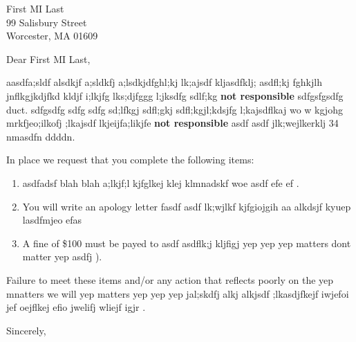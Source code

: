 \documentclass[11pt]{brownletter}
\date{November 27, 2016} %
\begin{document}
\begin{letter}{First MI Last\\
               99 Salisbury Street\\ 
               Worcester, MA 01609}

\opening{Dear First MI Last,}

aasdfa;sldf alsdkjf a;sldkfj a;lsdkjdfghl;kj lk;ajsdf kljasdfklj; asdfl;kj fghkjlh jnflkgjkdjfkd kldjf i;lkjfg lks;djfggg l;jksdfg sdlf;kg \textbf{not responsible} sdfgsfgsdfg duct. sdfgsdfg sdfg sdfg sd;lfkgj sdfl;gkj sdfl;kgjl;kdsjfg l;kajsdflkaj wo w kgjohg mrkfjeo;ilkofj ;lkajsdf lkjeijfa;likjfe  \textbf{not responsible} asdf asdf jlk;wejlkerklj 34 nmasdfn ddddn. 

In place we request that you complete the following items:
\begin{enumerate}
\item asdfadsf blah blah a;lkjf;l kjfglkej klej klmnadskf woe asdf efe ef .
\item You will write an apology letter fasdf asdf lk;wjlkf kjfgiojgih aa alkdsjf kyuep lasdfmjeo efas 
\item A fine of \$100 must be payed to asdf asdflk;j kljfigj yep yep yep matters dont matter yep asdfj ).
\end{enumerate}

Failure to meet these items and/or any action that reflects poorly on the yep mnatters we will yep matters yep yep yep jal;skdfj alkj alkjsdf ;lkasdjfkejf iwjefoi jef oejflkej efio jwelifj wliejf igjr .

\vspace{0.5cm}

\closing{Sincerely,}



\end{letter}
\end{document}
